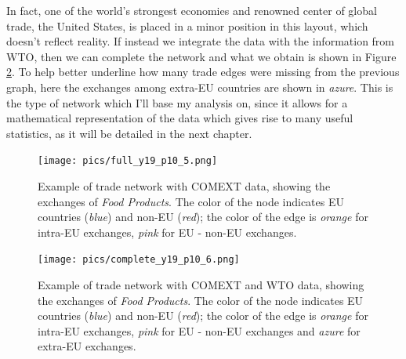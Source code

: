 In fact, one of the world's strongest economies and renowned center of global trade, the United States, is placed in a minor position in this layout, which doesn't reflect reality. If instead we integrate the data with the information from WTO, then we can complete the network and what we obtain is shown in Figure \ref{fig:gcomplete}. To help better underline how many trade edges were missing from the previous graph, here the exchanges among extra-EU countries are shown in \textit{azure}. This is the type of network which I'll base my analysis on, since it allows for a mathematical representation of the data which gives rise to many useful statistics, as it will be detailed in the next chapter.
\pagebreak
\begin{figure}[H]
    \centering
    \texttt{[image: pics/full\_y19\_p10\_5.png]}
    \caption[Example of the trade network of from COMEXT data.]{Example of trade network with COMEXT data, showing the exchanges of \textit{Food Products}. The color of the node indicates EU countries (\textit{blue}) and non-EU (\textit{red}); the color of the edge is \textit{orange} for intra-EU exchanges, \textit{pink} for EU - non-EU exchanges.}
    \label{fig:gcomext}
\end{figure}
\begin{figure}[H]
    \centering
    \texttt{[image: pics/complete\_y19\_p10\_6.png]}
    \caption[Example of trade network with COMEXT and WTO data.]{Example of trade network with COMEXT and WTO data, showing the exchanges of \textit{Food Products}. The color of the node indicates EU countries (\textit{blue}) and non-EU (\textit{red}); the color of the edge is \textit{orange} for intra-EU exchanges, \textit{pink} for EU - non-EU exchanges and \textit{azure} for extra-EU exchanges.}
    \label{fig:gcomplete}
\end{figure}


